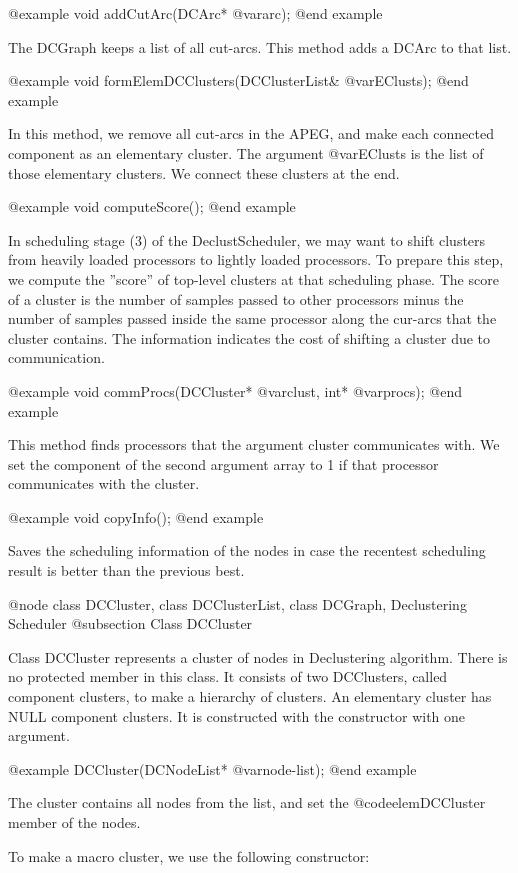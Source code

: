 @example
void addCutArc(DCArc* @var{arc});
@end example

The DCGraph keeps a list of all cut-arcs. This method adds
a DCArc to that list.

@example
void formElemDCClusters(DCClusterList& @var{EClusts});
@end example

In this method, we remove all cut-arcs in the APEG, and make each
connected component as an elementary cluster. The argument @var{EClusts}
is the list of those elementary clusters. We connect these clusters at
the end.

@example
void computeScore();
@end example

In scheduling stage (3) of the DeclustScheduler, we may want to shift
clusters from heavily loaded processors to lightly loaded processors. To
prepare this step, we compute the ''score'' of top-level clusters at that
scheduling phase. The score of a cluster is the number of samples passed
to other processors minus the number of samples passed inside the same
processor along the cur-arcs that the cluster contains.
The information indicates the cost of shifting a cluster due to
communication.

@example
void commProcs(DCCluster* @var{clust}, int* @var{procs});
@end example

This method finds processors that the argument cluster communicates with.
We set the component of the second argument array to 1 if that processor
communicates with the cluster.

@example
void copyInfo();
@end example

Saves the scheduling information of the nodes in case the recentest
scheduling result is better than the previous best.

@node class DCCluster, class DCClusterList, class DCGraph, Declustering Scheduler
@subsection Class DCCluster

Class DCCluster represents a cluster of nodes in Declustering algorithm.
There is no protected member in this class.
It consists of two DCClusters, called component clusters, to make 
a hierarchy of clusters. An elementary cluster has NULL component clusters.
It is constructed with the constructor with one argument.

@example
DCCluster(DCNodeList* @var{node-list});
@end example

The cluster contains all nodes from the list, and set the @code{elemDCCluster}
member of the nodes.

To make a macro cluster, we use the following constructor:

